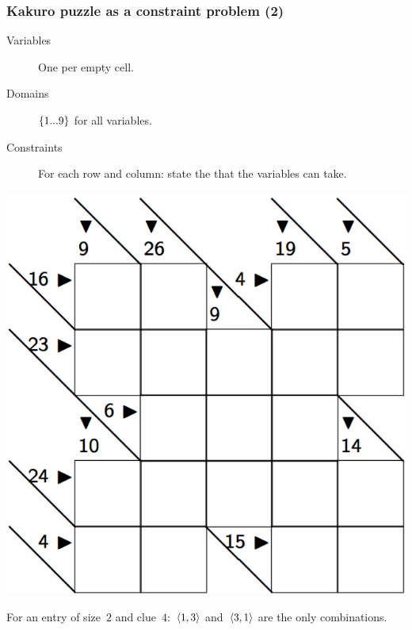 \documentclass{beamer}
\newcommand{\stressed}[1]{\emph{{\color{red!50}{#1}}}}
\begin{document}
\begin{frame}
  \frametitle{Kakuro puzzle as a constraint problem (2)}
  \begin{minipage}{0.5\textwidth}
    \begin{description}
      \item[Variables] One per empty cell.
      \item[Domains] $\left\{1...9\right\}$ for all variables.
      \item[Constraints] For each row and column: state the \stressed{possible
        combinations of values} that the variables can take.
    \end{description} 
  \end{minipage}
  \begin{minipage}{0.45\textwidth}
    \includegraphics[scale=0.2]{kakuro.png}
  \end{minipage}

  \bigskip
  For an entry of size~$2$ and clue~$4$:~$\left\langle1,3\right\rangle$ and~$\left\langle3,1\right\rangle$
  are the only combinations.
\end{frame}
\end{document}
